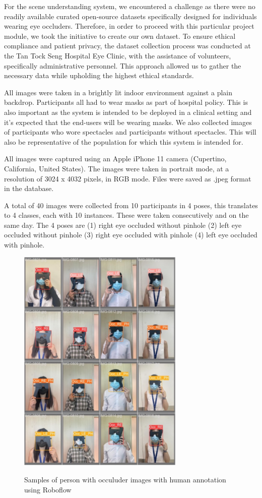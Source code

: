 \documentclass{article}
\begin{document}
For the scene understanding system, we encountered a challenge as there were no readily available curated open-source datasets specifically designed for individuals wearing eye occluders. Therefore, in order to proceed with this particular project module, we took the initiative to create our own dataset. To ensure ethical compliance and patient privacy, the dataset collection process was conducted at the Tan Tock Seng Hospital Eye Clinic, with the assistance of volunteers, specifically administrative personnel. This approach allowed us to gather the necessary data while upholding the highest ethical standards.

All images were taken in a brightly lit indoor environment against a plain backdrop. Participants all had to wear masks as part of hospital policy. This is also important as the system is intended to be deployed in a clinical setting and it’s expected that the end-users will be wearing masks. We also collected images of participants who wore spectacles and participants without spectacles. This will also be representative of the population for which this system is intended for.

All images were captured using an Apple iPhone 11 camera (Cupertino, California, United States). The images were taken in portrait mode, at a resolution of 3024 x 4032 pixels, in RGB mode. Files were saved as .jpeg format in the database.

A total of 40 images were collected from 10 participants in 4 poses, this translates to 4 classes, each with 10 instances. These were taken consecutively and on the same day. The 4 poses are (1) right eye occluded without pinhole (2) left eye occluded without pinhole (3) right eye occluded with pinhole (4) left eye occluded with pinhole.

 \begin{figure}[tbh]
    \begin{center}
        \includegraphics[width=8cm]{yolo_annotated.jpg}\
        \caption{Samples of person with occuluder images with human annotation using Roboflow \cite{roboflow}
        \label{figure7}} 
    \end{center}
\end{figure}
\end{document}

